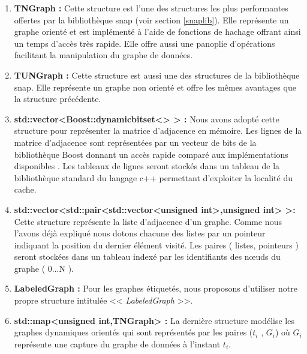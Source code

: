 \begin{enumerate}[label=(\alph*)]
\item \textbf{TNGraph :}
Cette structure est l'une des structures les plus performantes offertes par la bibliothèque 	 \gls{snap} (voir section \ref{snaplib}). Elle représente un graphe orienté et est implémenté à l'aide de fonctions de hachage offrant ainsi un temps d'accès très rapide. Elle offre aussi une panoplie d'opérations facilitant la manipulation du graphe de données.

\item\textbf{TUNGraph :}
Cette structure est aussi une des structures de la bibliothèque \gls{snap}. Elle représente un graphe non orienté et offre les mêmes avantages que la structure précédente. 

\item\textbf{std::vector<Boost::dynamicbitset<> > :}
 Nous avons adopté cette structure pour représenter la matrice d'adjacence en mémoire. Les lignes de la matrice d'adjacence sont représentées par un vecteur de bits de la bibliothèque Boost donnant un accès rapide comparé aux implémentations disponibles  \citep{pieterse2010performance}. Les tableaux de lignes seront stockés dans un tableau de la bibliothèque standard du langage c++ permettant d'exploiter la localité du cache. %
 
\item\textbf{std::vector<std::pair<std::vector<unsigned int>,unsigned int> >:}
Cette structure représente la liste d'adjacence d'un graphe. Comme nous l'avons déjà expliqué nous dotons chacune des listes par un pointeur indiquant la position du dernier élément visité. Les paires ( listes, pointeurs ) seront stockées dans un tableau indexé par les identifiants des nœuds du graphe ( 0...N ).

\item\textbf{LabeledGraph :} Pour les graphes étiquetés, nous proposons d'utiliser notre propre structure intitulée << \textit{LabeledGraph} >>.

\item \textbf{std::map<unsigned int,TNGraph> :}
La dernière structure modélise les graphes dynamiques orientés qui sont représentés par les paires ($t_i$ , $G_i$) où $G_i$ représente une capture du graphe de données à l'instant $t_i$.


\end{enumerate}



